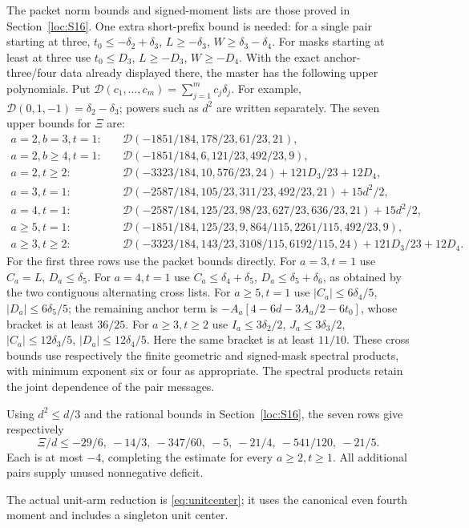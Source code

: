 The packet norm bounds and signed-moment lists are those proved in
Section~\ref{loc:S16}. One extra short-prefix bound is needed: for a
single pair starting at three,
$t_0\le-\delta_{2}+\delta_{3}$, $L\ge-\delta_{3}$, $W\ge \delta_{3}-\delta_{4}$.
For masks starting at least at three use
$t_0\le D_3$, $L\ge-D_3$, $W\ge-D_4$.
With the exact anchor-three/four data already displayed there, the master
has the following upper polynomials. Put $\mathcal D(c_1,\ldots,c_m)=\sum_{j=1}^m c_j\delta_{j}$.
For example, $\mathcal D(0,1,-1)=\delta_{2}-\delta_{3}$; powers such as $d^2$
are written separately. The seven upper bounds for $\Xi$ are:
\begin{align*}
 a=2,b=3,t=1:\quad&\mathcal D(-1851/184,178/23,61/23,21),\\
 a=2,b\ge4,t=1:\quad&\mathcal D(-1851/184,6,121/23,492/23,9),\\
 a=2,t\ge2:\quad&\mathcal D(-3323/184,10,576/23,24)+121D_3/23+12D_4,\\
 a=3,t=1:\quad&\mathcal D(-2587/184,105/23,311/23,492/23,21)+15d^2/2,\\
 a=4,t=1:\quad&\mathcal D(-2587/184,125/23,98/23,627/23,636/23,21)+15d^2/2,\\
 a\ge5,t=1:\quad&\mathcal D(-1851/184,125/23,9,864/115,2261/115,492/23,9),\\
 a\ge3,t\ge2:\quad&\mathcal D(-3323/184,143/23,3108/115,6192/115,24)
                         +121D_3/23+12D_4.
\end{align*}
For the first three rows use the packet bounds directly.
For $a=3,t=1$ use $C_a=L$, $D_a\le \delta_{5}$.
For $a=4,t=1$ use $C_a\le \delta_{4}+\delta_{5}$, $D_a\le \delta_{5}+\delta_{6}$,
as obtained by the two contiguous alternating cross lists.
For $a\ge5,t=1$ use
$|C_a|\le6\delta_{4}/5$, $|D_a|\le6\delta_{5}/5$;
the remaining anchor term is
$-A_a[4-6d-3A_a/2-6t_0]$, whose bracket is at least $36/25$.
For $a\ge3,t\ge2$ use $I_a\le3\delta_{2}/2$, $J_a\le3\delta_{3}/2$,
$|C_a|\le12\delta_{3}/5$, $|D_a|\le12\delta_{4}/5$.
Here the same bracket is at least $11/10$.
These cross bounds use respectively the finite geometric and signed-mask
spectral products, with minimum exponent six or four as appropriate.
The spectral products retain the joint dependence of the pair messages.

Using $d^2\le d/3$ and the rational bounds in
Section~\ref{loc:S16}, the seven rows give respectively
\[
 \Xi/d\le-29/6,\ -14/3,\ -347/60,\ -5,\ -21/4,\ -541/120,\ -21/5.
\]
Each is at most $-4$, completing the estimate for every $a\ge2,t\ge1$.
All additional pairs supply unused nonnegative deficit.

The actual unit-arm reduction is \eqref{eq:unitcenter}; it uses the
canonical even fourth moment and includes a singleton unit center.
